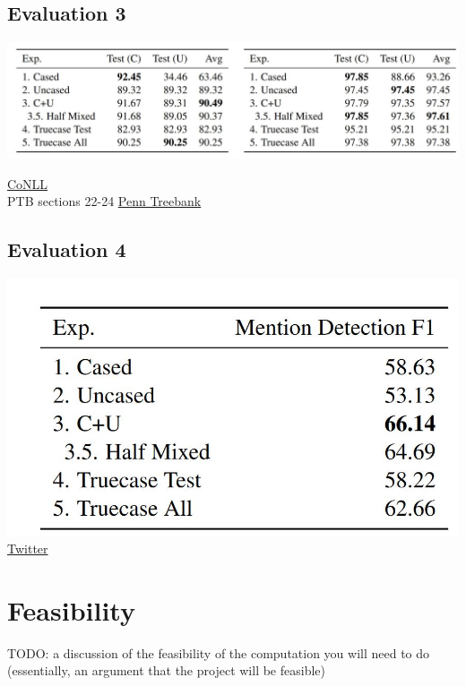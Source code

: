 \documentclass{article}
\begin{document}
\subsection*{Evaluation 3}
\includegraphics{stat3}

\noindent
\href{https://dl.acm.org/doi/10.3115/1119176.1119195}{CoNLL}\\
PTB sections 22-24 \href{https://www.seas.upenn.edu/~pdtb/}{Penn Treebank}


\subsection*{Evaluation 4}
\includegraphics{stat4}
\href{https://github.com/GateNLP/broad_twitter_corpus}{Twitter}




\section{Feasibility}
TODO: a discussion of the feasibility of the computation you will need to do (essentially, an argument that the project will be feasible)
\end{document}
